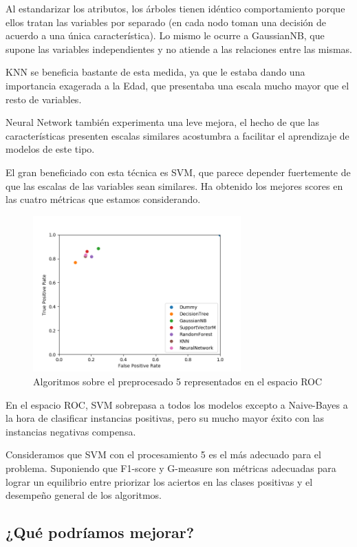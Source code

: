 \documentclass{article}
\begin{document}
Al estandarizar los atributos, los árboles tienen idéntico
comportamiento porque ellos tratan las variables por separado (en cada
nodo toman una decisión de acuerdo a una única característica). Lo
mismo le ocurre a GaussianNB, que supone las variables independientes
y no atiende a las relaciones entre las mismas.

KNN se beneficia bastante de esta medida, ya que le estaba dando una
importancia exagerada a la Edad, que presentaba una escala mucho mayor
que el resto de variables.

Neural Network también experimenta una leve mejora, el hecho de que
las características presenten escalas similares acostumbra a facilitar
el aprendizaje de modelos de este tipo.

El gran beneficiado con esta técnica es SVM, que parece depender
fuertemente de que las escalas de las variables sean similares. Ha
obtenido los mejores scores en las cuatro métricas que estamos
considerando.

\begin{figure}[H]
  \centering
  \label{fig:roc5}
  \caption{Algoritmos sobre el preprocesado 5 representados en el espacio ROC}
  \includegraphics[width=80mm]{figures/roc5}
\end{figure}

En el espacio ROC, SVM sobrepasa a todos los modelos excepto a
Naive-Bayes a la hora de clasificar instancias positivas, pero su
mucho mayor éxito con las instancias negativas compensa.

Consideramos que SVM con el procesamiento 5 es el más adecuado para el
problema. Suponiendo que F1-score y G-measure son métricas adecuadas
para lograr un equilibrio entre priorizar los aciertos en las clases
positivas y el desempeño general de los algoritmos.

\subsection{¿Qué podríamos mejorar?}
\end{document}
